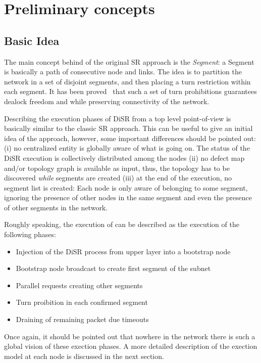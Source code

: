 
\section{Preliminary concepts}
\label{sec:disr_concepts}

\subsection{Basic Idea}
The main concept behind of the original SR approach is the
\emph{Segment}: a Segment is basically a path of consecutive node
and links. 
The idea is to partition the network in a set of disjoint segments, and then
placing a turn restriction within each segment. It has been proved~\cite{}
that such a set of turn prohibitions guarantees dealock freedom and
while preserving connectivity of the network.

Describing the execution phases of DiSR from a top level point-of-view
is basically similar to the classic SR approach. This can be useful to
give an initial idea of the approach, however, some important
differences should be pointed out:(i) no centralized entity is
globally aware of what is going on. The status of the DiSR execution
is collectively distributed among the nodes (ii) no defect map and/or
topology graph is available as input, thus, the topology has to be
discovered \emph{while} segments are created (iii) at the end of the
execution, no segment list is created: Each node is only aware of
belonging to some segment, ignoring the presence of other nodes
in the same segment and even the presence of other segments in the
network.

Roughly speaking, the execution of can be described as the execution
of the following phases:
\begin{itemize}
\item Injection of the DiSR process from upper layer into a bootstrap
node
\item Bootstrap node broadcast to create first segment of the subnet
\item Parallel requests creating other segments
\item Turn proibition in each confirmed segment
\item Draining of remaining packet due timeouts
\end{itemize}

Once again, it should be pointed out that nowhere in the network there
is such a global vision of these exection phases. A more detailed
description of the exection model at each node is discussed in the
next section.

